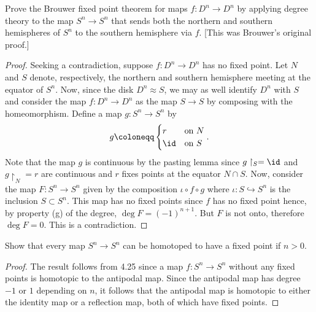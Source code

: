 \begin{problem}[Hatcher {\S}2.2, Ex.\@ 1]
Prove the Brouwer fixed point theorem for maps $f\colon D^n\to D^n$ by
applying degree theory to the map $S^n\to S^n$ that sends both the northern
and southern hemispheres of $S^n$ to the southern hemisphere via $f$. [This
was Brouwer’s original proof.]
\end{problem}
\begin{proof}
Seeking a contradiction, suppose $f\colon D^n\to D^n$ has no fixed
point. Let $N$ and $S$ denote, respectively, the northern and southern
hemisphere meeting at the equator of $S^n$. Now, since the disk $D^n\approx
S$, we may as well identify $D^n$ with $S$ and consider the map $f\colon
D^n\to D^n$ as the map $S\to S$ by composing with the homeomorphism. Define
a map $g\colon S^n\to S^n$ by
\begin{equation}
\label{eq:half-antipodal-map}
g
\coloneqq
\begin{cases}
r&\text{on $N$}\\
\id&\text{on $S$}
\end{cases}.
\end{equation}
Note that the map $g$ is continuous by the pasting lemma since
$g\restriction_S=\id$ and $g\restriction_N=r$ are continuous and $r$ fixes
points at the equator $N\cap S$. Now, consider the map $F\colon S^n\to S^n$
given by the composition $\iota\circ f\circ g$ where $\iota\colon
S\hookrightarrow S^n$ is the inclusion $S\subset S^n$. This map has no
fixed points since $f$ has no fixed point hence, by property (g) of the
degree, $\deg F=(-1)^{n+1}$. But $F$ is not onto, therefore $\deg
F=0$. This is a contradiction.
\end{proof}
\newpage

\begin{problem}[Hatcher {\S}2.2, Ex.\@ 6]
Show that every map $S^n\to S^n$ can be homotoped to have a fixed point
if $n>0$.
\end{problem}
\begin{proof}
The result follows from 4.25 since a map $f\colon S^n\to S^n$ without any
fixed points is homotopic to the antipodal map. Since the antipodal map has
degree $-1$ or $1$ depending on $n$, it follows that the antipodal map is
homotopic to either the identity map or a reflection map, both of which
have fixed points.
\end{proof}
\newpage

